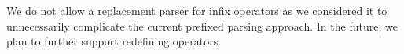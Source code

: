 We do not allow a replacement parser for infix
operators as we considered it to unnecessarily complicate the current
prefixed parsing approach. In the future, we plan to further support
redefining operators.

